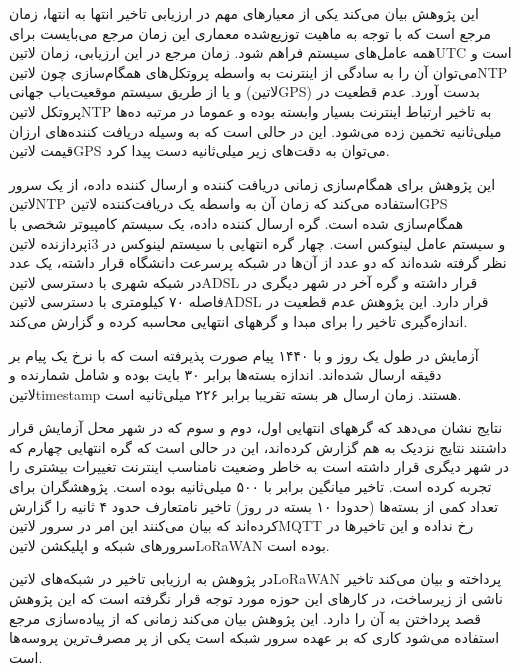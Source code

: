 این پژوهش بیان می‌کند یکی از معیارهای مهم در ارزیابی تاخیر انتها به انتها، زمان مرجع است که با توجه به ماهیت توزیع‌شده معماری این زمان مرجع می‌بایست برای همه عامل‌های
سیستم فراهم شود. زمان مرجع در این ارزیابی، زمان ‌لاتین{UTC} است و می‌توان آن را به سادگی از اینترنت به واسطه پروتکل‌های همگام‌سازی چون ‌لاتین{NTP}
و یا از طریق سیستم موقعیت‌یاب جهانی (‌لاتین{GPS}) بدست آورد.
عدم قطعیت در پروتکل ‌لاتین{NTP} به تاخیر ارتباط اینترنت بسیار وابسته بوده و عموما در مرتبه ده‌ها میلی‌ثانیه تخمین زده می‌شود.
این در حالی است که به وسیله دریافت کننده‌های ارزان قیمت ‌لاتین{GPS} می‌توان به دقت‌های زیر میلی‌ثانیه دست پیدا کرد.

این پژوهش برای همگام‌سازی زمانی دریافت کننده و ارسال کننده داده، از یک سرور ‌لاتین{NTP} استفاده می‌کند که زمان آن به واسطه یک دریافت‌کننده ‌لاتین{GPS} همگام‌سازی شده است.
گره ارسال کننده داده، یک سیستم کامپیوتر شخصی با پردازنده ‌لاتین{i3} و سیستم عامل لینوکس است. چهار گره انتهایی با سیستم لینوکس در نظر گرفته شده‌اند که دو عدد از آن‌ها در شبکه پرسرعت دانشگاه قرار داشته،
یک عدد در شبکه شهری با دسترسی ‌لاتین{ADSL} قرار داشته و گره آخر در شهر دیگری در فاصله ۷۰ کیلومتری با دسترسی ‌لاتین{ADSL} قرار دارد.
این پژوهش عدم قطعیت در اندازه‌گیری تاخیر را برای مبدا و گرههای انتهایی محاسبه کرده و گزارش می‌کند.

آزمایش در طول یک روز و با ۱۴۴۰ پیام صورت پذیرفته است که با نرخ یک پیام بر دقیقه ارسال شده‌اند.
اندازه بسته‌ها برابر ۳۰ بایت بوده و شامل شمارنده و ‌لاتین{timestamp} هستند.
زمان ارسال هر بسته تقریبا برابر ۲۲۶ میلی‌ثانیه است.

نتایج نشان می‌دهد که گرههای انتهایی اول، دوم و سوم که در شهر محل آزمایش قرار داشتند نتایج نزدیک به هم گزارش کرده‌اند، این در حالی است که گره انتهایی چهارم
که در شهر دیگری قرار داشته است به خاطر وضعیت نامناسب اینترنت تغییرات بیشتری را تجربه کرده است.
تاخیر میانگین برابر با ۵۰۰ میلی‌ثانیه بوده است.
پژوهشگران برای تعداد کمی از بسته‌ها (حدودا ۱۰ بسته در روز) تاخیر نامتعارف حدود ۴ ثانیه را گزارش کرده‌اند که بیان می‌کنند این امر در سرور ‌لاتین{MQTT}
رخ نداده و این تاخیرها در سرورهای شبکه و اپلیکشن ‌لاتین{LoRaWAN} بوده است.


در پژوهش  به ارزیابی تاخیر در شبکه‌های ‌لاتین{LoRaWAN} پرداخته و بیان می‌کند تاخیر ناشی از زیرساخت، در کارهای این حوزه مورد توجه قرار نگرفته است
که این پژوهش قصد پرداختن به آن را دارد.
این پژوهش بیان می‌کند زمانی که از پیاده‌سازی مرجع استفاده می‌شود کاری که بر عهده سرور شبکه است یکی از پر مصرف‌ترین پروسه‌ها است.

